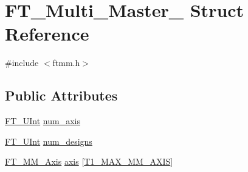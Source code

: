 \hypertarget{struct_f_t___multi___master__}{\section{F\-T\-\_\-\-Multi\-\_\-\-Master\-\_\- Struct Reference}
\label{struct_f_t___multi___master__}
}


{\ttfamily \#include $<$ftmm.\-h$>$}

\subsection*{Public Attributes}
\begin{DoxyCompactItemize}
\item 
\hyperlink{fttypes_8h_abcb8db4dbf35d2b55a9e8c7b0926dc52}{F\-T\-\_\-\-U\-Int} \hyperlink{struct_f_t___multi___master___a90a0ace4e40b91912259ad52fc86fb6f}{num\-\_\-axis}
\item 
\hyperlink{fttypes_8h_abcb8db4dbf35d2b55a9e8c7b0926dc52}{F\-T\-\_\-\-U\-Int} \hyperlink{struct_f_t___multi___master___a78b797ee560f4b00795a7dce9656178d}{num\-\_\-designs}
\item 
\hyperlink{ftmm_8h_a3af0f0b8fec16073eb9795eb69a645ee}{F\-T\-\_\-\-M\-M\-\_\-\-Axis} \hyperlink{struct_f_t___multi___master___a1eb062ff3b5ac245ab9421a46b349818}{axis} \mbox{[}\hyperlink{t1tables_8h_a471108ae668a65363dd36bb17e1ecbbe}{T1\-\_\-\-M\-A\-X\-\_\-\-M\-M\-\_\-\-A\-X\-I\-S}\mbox{]}
\end{DoxyCompactItemize}


